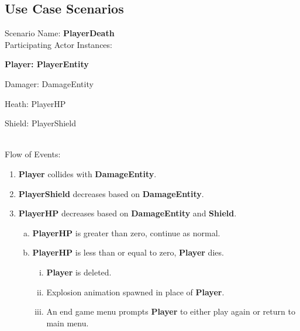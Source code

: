 \documentclass[12pt]{article}       %
\begin{document}
\subsection{Use Case Scenarios} 
Scenario Name: {\bf PlayerDeath} \\
Participating Actor Instances:        \hspace{46pt} {\bf Player: PlayerEntity

					          \hspace{2.6 in}   Damager: DamageEntity 

					          \hspace{2.6in}    Heath: PlayerHP

						\hspace{2.6in}   Shield: PlayerShield} \vspace{10pt}  \\ 
Flow of Events: 
\begin{enumerate} 
\item {\bf Player }collides with {\bf DamageEntity}.
       \item {\bf PlayerShield} decreases based on {\bf DamageEntity}. 
       \item {\bf PlayerHP} decreases based on {\bf DamageEntity} and {\bf Shield}. 
                \begin{enumerate}[a.]
                 \item {\bf PlayerHP} is greater than zero, continue as normal.
                 \item{\bf PlayerHP} is less than or equal to zero, {\bf Player} dies.
                      \begin{enumerate}[i.]
                	\item {\bf Player} is deleted.
                	\item Explosion animation spawned in place of {\bf Player}.
		\item An end game menu prompts {\bf Player} to either play again or return to main menu.
		 \end{enumerate}
                \end{enumerate}
\end{enumerate}
\end{document}
